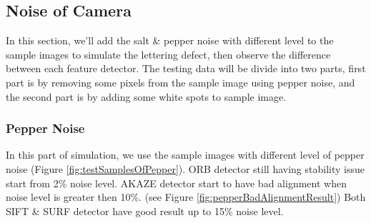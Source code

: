 	\subsection{Noise of Camera}
		In this section, we'll add the salt \& pepper noise with different level to the sample images to simulate the lettering defect, then observe the difference between each feature detector.
		The testing data will be divide into two parts, first part is by removing some pixels from the sample image using pepper noise, and the second part is by adding some white spots to sample image.
		
		\subsubsection{Pepper Noise}
		In this part of simulation, we use the sample images with different level of pepper noise (Figure \ref{fig:testSamplesOfPepper}).
		ORB detector still having stability issue start from 2\% noise level. AKAZE detector start to have bad alignment when noise level is greater then 10\%. (see Figure \ref{fig:pepperBadAlignmentResult})
		Both SIFT \& SURF detector have good result up to 15\% noise level.
